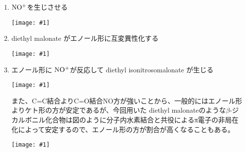 \documentclass[a4paper,papersize,dvipdfmx]{jsarticle}
\newcommand{\pict}[2]{\begin{center} \texttt{[image: \#1]} \end{center}}   %
\begin{document}
\begin{enumerate}
\item $\rm NO^+$を生じさせる
\pict{imgs1/hk1.jpeg}{10}
\item diethyl malonate がエノール形に互変異性化する
\pict{imgs1/hk2.jpeg}{12}
\item エノール形に $\rm NO^+$が反応して diethyl isonitrosomalonate が生じる
\pict{imgs1/hk3.jpeg}{12}

また、C=C結合よりC=O結合NO方が強いことから、一般的にはエノール形よりケト形の方が安定であるが、今回用いた diethyl malonateのような$\beta$-ジカルボニル化合物は図のように分子内水素結合と共役によるπ電子の非局在化によって安定するので、エノール形の方が割合が高くなることもある。
\pict{imgs1/bck.jpeg}{7}
\end{enumerate}
\end{document}
